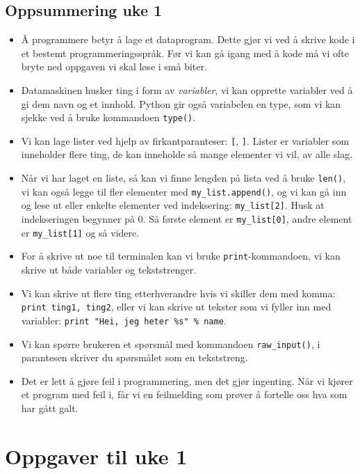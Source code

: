 \documentclass[a4paper, 11pt, notitlepage]{article}
\begin{document}
\subsection*{Oppsummering uke 1}

\begin{itemize}
	\item Å programmere betyr å lage et dataprogram. Dette gjør vi ved å skrive kode i et bestemt programmeringsspråk. Før vi kan gå igang med å kode må vi ofte bryte ned oppgaven vi skal løse i små biter.
	\item Datamaskinen husker ting i form av \emph{variabler}, vi kan opprette variabler ved å gi dem navn og et innhold. Python gir også variabelen en type, som vi kan sjekke ved å bruke kommandoen \verb+type()+.
	\item Vi kan lage lister ved hjelp av firkantparanteser: \verb+[+, \verb+]+. Lister er variabler som inneholder flere ting, de kan inneholde så mange elementer vi vil, av alle slag.
	\item Når vi har laget en liste, så kan vi finne lengden på lista ved å bruke \verb+len()+, vi kan også legge til fler elementer med \verb+my_list.append()+, og vi kan gå inn og lese ut eller enkelte elementer ved indeksering: \verb+my_list[2]+. Husk at indekseringen begynner på 0. Så første element er \verb+my_list[0]+, andre element er \verb+my_list[1]+ og så videre.
	\item For å skrive ut noe til terminalen kan vi bruke \verb+print+-kommandoen, vi kan skrive ut både variabler og tekststrenger.
	\item Vi kan skrive ut flere ting etterhverandre hvis vi skiller dem med komma: \verb+print ting1, ting2+, eller vi kan skrive ut tekster som vi fyller inn med variabler: \verb+print "Hei, jeg heter %s" % name+.
	\item Vi kan spørre brukeren et spørsmål med kommandoen \verb+raw_input()+, i parantesen skriver du spørsmålet som en tekststreng.
	\item Det er lett å gjøre feil i programmering, men det gjør ingenting. Når vi kjører et program med feil i, får vi en feilmelding som prøver å fortelle oss hva som har gått galt.
\end{itemize}

\clearpage

\section*{Oppgaver til uke 1}
\end{document}
